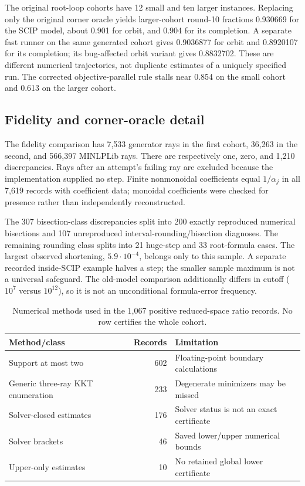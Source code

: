 The original root-loop cohorts have 12 small and ten larger instances.
Replacing only the original corner oracle yields larger-cohort round-10
fractions 0.930669 for the SCIP model, about 0.901 for orbit, and 0.904
for its completion. A separate fast runner on the same generated cohort
gives 0.9036877 for orbit and 0.8920107 for its completion; its bug-affected
orbit variant gives 0.8832702. These are different numerical trajectories,
not duplicate estimates of a uniquely specified run. The corrected
objective-parallel rule stalls near 0.854 on the small cohort and 0.613
on the larger cohort.

\subsection{Fidelity and corner-oracle detail}
\label{exp:corner-oracles}

The fidelity comparison has 7,533 generator rays in the first cohort,
36,263 in the second, and 566,397 MINLPLib rays. There are respectively
one, zero, and 1,210 discrepancies. Rays after an attempt's failing ray
are excluded because the implementation supplied no step. Finite
nonmonoidal coefficients equal $1/\alpha_j$ in all 7,619 records with
coefficient data; monoidal coefficients were checked for presence rather
than independently reconstructed.

The 307 bisection-class discrepancies split into 200 exactly reproduced
numerical bisections and 107 unreproduced interval-rounding/bisection
diagnoses. The remaining rounding class splits into 21 huge-step and
33 root-formula cases. The largest observed shortening, $5.9\cdot 10^{-4}$,
belongs only to this sample. A separate recorded inside-SCIP example
halves a step; the smaller sample maximum is not a universal safeguard.
The old-model comparison additionally differs in cutoff ($10^7$ versus
$10^{12}$), so it is not an unconditional formula-error frequency.

\begin{table}[h]
\centering
\caption{Numerical methods used in the 1,067 positive reduced-space
ratio records. No row certifies the whole cohort.}
\label{exp:oracle-table}
\begin{tabular}{@{}lrl@{}}
\toprule
Method/class & Records & Limitation \\
\midrule
Support at most two & 602 & Floating-point boundary calculations \\
Generic three-ray KKT enumeration & 233 & Degenerate minimizers may be missed \\
Solver-closed estimates & 176 & Solver status is not an exact certificate \\
Solver brackets & 46 & Saved lower/upper numerical bounds \\
Upper-only estimates & 10 & No retained global lower certificate \\
\bottomrule
\end{tabular}
\end{table}

